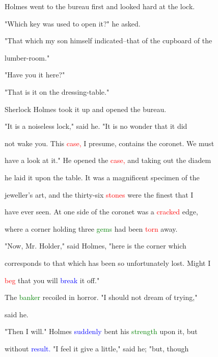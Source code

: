  Holmes went to the bureau first and looked hard at the lock.



 "Which key was used to open it?" he asked.



 "That which my son himself indicated--that of the cupboard of the

 lumber-room."



 "Have you it here?"



 "That is it on the dressing-table."



 Sherlock Holmes took it up and opened the bureau.



 "It is a noiseless lock," said he. "It is no wonder that it did

 not wake you. This \textcolor{red}{case,} I presume, contains the coronet. We must

 have a look at it." He opened the \textcolor{red}{case,} and taking out the diadem

 he laid it upon the table. It was a \textcolor{BurntOrange}{magnificent} specimen of the

 jeweller's \textcolor{BurntOrange}{art,} and the thirty-six \textcolor{red}{stones} were the finest that I

 have ever seen. At one side of the coronet was a \textcolor{red}{cracked} edge,

 where a corner holding three \textcolor{green}{gems} had been \textcolor{red}{torn} away.



 "Now, Mr. Holder," said Holmes, "here is the corner which

 corresponds to that which has been so unfortunately \textcolor{BurntOrange}{lost.} Might I

 \textcolor{red}{beg} that you will \textcolor{blue}{break} it off."



 The \textcolor{green}{banker} recoiled in \textcolor{BurntOrange}{horror.} "I should not dream of trying,"

 said he.



 "Then I will." Holmes \textcolor{blue}{suddenly} bent his \textcolor{green}{strength} upon it, but

 without \textcolor{blue}{result.} "I feel it give a little," said he; "but, though

